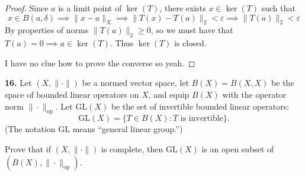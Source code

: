 \documentclass{article}
\newcommand{\op}{\mathrm{op}}
\newcommand{\GL}{\mathrm{GL}}
\theoremstyle{plain} %
\numberwithin{thm}{section} %
\theoremstyle{definition}
\begin{document}
\begin{enumerate}[label=(\alph*)]
\begin{proof}
            Since \(a\) is a limit point of \(\ker (T)\), there exists \(x \in \ker (T)\) such that
            \[
                x \in B(a, \delta) \implies \|x -a\| _X \implies \|T(x)-T(a)\| _2 < \varepsilon \implies \|T(a)\| _2 < \varepsilon
            \]
            By properties of norms \(\|T(a)\| _2 \geq 0\), so we must have that \(T(a) = 0 \implies a \in \ker (T)\). Thus \(\ker(T)\) is closed.

            I have no clue how to prove the converse so yeah.

        \end{proof}
    \end{enumerate}
    \pagebreak
    \noindent\textbf{16.} Let $(X,\|\cdot\|)$ be a normed vector space, let $B(X)=B(X,X)$ be the space of bounded linear operators on $X$, and equip $B(X)$ with the operator norm $\|\cdot\|_{\op}$. Let $\GL(X)$ be the set of invertible bounded linear operators:
        \[ \GL(X) = \{T\in B(X) : \text{$T$ is invertible}\}. \]
    (The notation $\GL$ means ``general linear group.'')
    
    Prove that if $(X,\|\cdot\|)$ is complete, then $\GL(X)$ is an open subset of $(B(X),\|\cdot\|_{\mathrm{op}})$.
    
\end{document}
